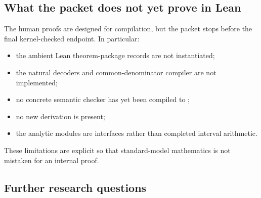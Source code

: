 \subsection{What the packet does not yet prove in Lean}

The human proofs are designed for compilation, but the packet stops before the
final kernel-checked endpoint.  In particular:
\begin{itemize}
\item the ambient Lean theorem-package records are not instantiated;
\item the natural decoders and common-denominator compiler are not implemented;
\item no concrete semantic checker has yet been compiled to ;
\item no new  derivation is present;
\item the analytic modules are interfaces rather than completed interval
  arithmetic.
\end{itemize}
These limitations are explicit so that standard-model mathematics is not
mistaken for an internal proof.

\subsection{Further research questions}

